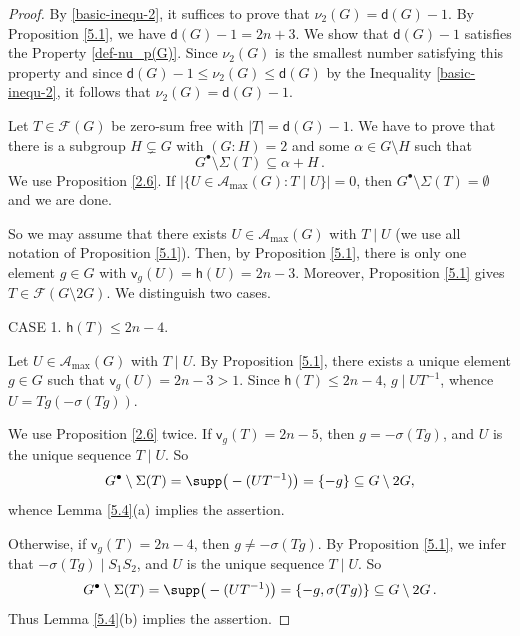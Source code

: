 \documentclass[a4paper, 10pt]{amsart}
\theoremstyle{plain}
\theoremstyle{definition}
\numberwithin{equation}{section}
\begin{document}
{\begin{proof}
By \eqref{basic-inequ-2}, it suffices to prove that $\nu_2 (G) = \mathsf d (G)-1$.
By Proposition \ref{5.1}, we have  $\mathsf d (G)-1 = 2n+3$.
	We show that $\mathsf d (G)-1$ satisfies the Property  \eqref{def-nu_p(G)}. Since $\nu_2 (G)$ is the smallest number satisfying this property and since $\mathsf d (G)-1 \le \nu_2 (G) \le \mathsf d (G)$ by the Inequality \eqref{basic-inequ-2}, it follows that $\nu_2 (G) = \mathsf d (G)-1$.
	
	Let $T \in \mathcal F (G)$ be  zero-sum free with $|T|=\mathsf d (G)-1$. We have to prove that there is a subgroup $H \subsetneq G$ with $(G \colon H) = 2$ and some $\alpha \in G \setminus H$ such that
	\[
	G^{\bullet} \setminus \Sigma (T) \subseteq \alpha + H \,.
	\]
We use Proposition \ref{2.6}. If $|\{U \in \mathcal A_{\max}(G) \colon T \mid U \}|=0$, then $G^{\bullet} \setminus \Sigma (T)=\emptyset$ and we are done.

So we may assume that there exists $U \in \mathcal A_{\max} (G)$ with $T\mid U$ (we use all notation of Proposition \ref{5.1}). Then, by Proposition \ref{5.1}, there is only one element $g \in G$ with $\mathsf v_g (U) = \mathsf h (U) = 2n-3$. Moreover, Proposition \ref{5.1} gives $T\in\mathcal F(G\setminus2G)$.
We distinguish two cases.


\smallskip
\noindent
CASE 1.  $\mathsf h (T)\le 2n-4$.

Let $U \in \mathcal A_{\max} (G)$ with $T \mid U$. 
	By Proposition \ref{5.1},
	there exists a unique element
	$g\in G$ such that
	$\mathsf v_g(U)=2n-3>1$.
	Since $\mathsf h(T)\le 2n-4$,
$g \mid UT^{-1}$, whence $U=Tg(-\sigma(Tg))$. 

We use Proposition \ref{2.6} twice. If $\mathsf v_g(T)=2n-5$, then $g= -\sigma(Tg)$, and $U$ is the unique sequence $T\mid U$. So
	$$
	G^{\bullet}\setminus \Sigma (T)  = \supp \big(-(UT^{-1}) \big)
	=\{ -g\} \subseteq G \setminus 2G,
	$$
whence Lemma \ref{5.4}(a) implies the assertion. 
	
	Otherwise, if $\mathsf v_g(T)=2n-4$, then $g\ne -\sigma(Tg)$. By Proposition \ref{5.1}, we infer that  $-\sigma(Tg)\mid S_1S_2$, and $U$ is the unique sequence $T\mid U$. So
\[
	G^{\bullet}\setminus \Sigma (T)  = \supp \big(-(UT^{-1}) \big)
	=\{ -g,\sigma(Tg)\}
	\subseteq G \setminus 2G \,.
\]
Thus
Lemma \ref{5.4}(b) implies the assertion.
	

\end{proof}}
\end{document}
